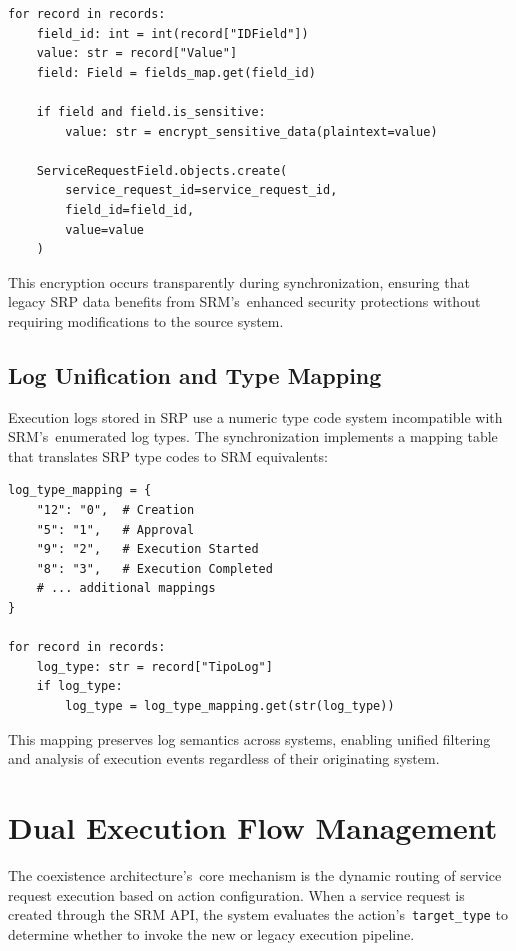 \begin{verbatim}
for record in records:
    field_id: int = int(record["IDField"])
    value: str = record["Value"]
    field: Field = fields_map.get(field_id)
    
    if field and field.is_sensitive:
        value: str = encrypt_sensitive_data(plaintext=value)
    
    ServiceRequestField.objects.create(
        service_request_id=service_request_id,
        field_id=field_id,
        value=value
    )
\end{verbatim}

This encryption occurs transparently during synchronization, ensuring that legacy SRP data benefits from SRM's~enhanced security protections without requiring modifications to the source system.

\subsection{Log Unification and Type Mapping}

Execution logs stored in SRP use a numeric type code system incompatible with SRM's~enumerated log types. The synchronization implements a mapping table that translates SRP type codes to SRM equivalents:

\begin{verbatim}
log_type_mapping = {
    "12": "0",  # Creation
    "5": "1",   # Approval
    "9": "2",   # Execution Started
    "8": "3",   # Execution Completed
    # ... additional mappings
}

for record in records:
    log_type: str = record["TipoLog"]
    if log_type:
        log_type = log_type_mapping.get(str(log_type))
\end{verbatim}

This mapping preserves log semantics across systems, enabling unified filtering and analysis of execution events regardless of their originating system.

\section{Dual Execution Flow Management}

The coexistence architecture's~core mechanism is the dynamic routing of service request execution based on action configuration. When a service request is created through the SRM API, the system evaluates the action's~\texttt{target\_type} to determine whether to invoke the new or legacy execution pipeline.

